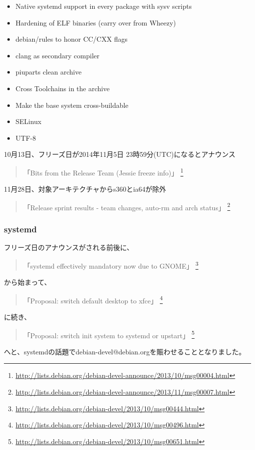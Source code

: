 \documentclass[mingoth,a4paper]{jsarticle}
\begin{document}
\begin{screen}
  \begin{itemize}
  \item Native systemd support in every package with sysv scripts
  \item Hardening of ELF binaries (carry over from Wheezy)
  \item debian/rules to honor CC/CXX flags
  \item clang as secondary compiler
  \item piuparts clean archive
  \item Cross Toolchains in the archive
  \item Make the base system cross-buildable
  \item SELinux
  \item UTF-8
  \end{itemize}
\end{screen}

10月13日、フリーズ日が2014年11月5日 23時59分(UTC)になるとアナウンス
\begin{quote}
  「Bits from the Release Team (Jessie freeze info)」
  \footnote{\url{http://lists.debian.org/debian-devel-announce/2013/10/msg00004.html}}
\end{quote}

11月28日、対象アーキテクチャからs360とia64が除外
\begin{quote}
  「Release sprint results - team changes, auto-rm and arch status」
  \footnote{\url{http://lists.debian.org/debian-devel-announce/2013/11/msg00007.html}}
\end{quote}


\subsubsection{systemd}

フリーズ日のアナウンスがされる前後に、
\begin{quote}
  「systemd effectively mandatory now due to GNOME」
  \footnote{\url{http://lists.debian.org/debian-devel/2013/10/msg00444.html}}
\end{quote}
から始まって、
\begin{quote}
  「Proposal: switch default desktop to xfce」
  \footnote{\url{http://lists.debian.org/debian-devel/2013/10/msg00496.html}}
\end{quote}
に続き、
\begin{quote}
  「Proposal: switch init system to systemd or upstart」
  \footnote{\url{http://lists.debian.org/debian-devel/2013/10/msg00651.html}}
\end{quote}
へと、systemdの話題でdebian-devel@debian.orgを賑わせることとなりました。
\end{document}
